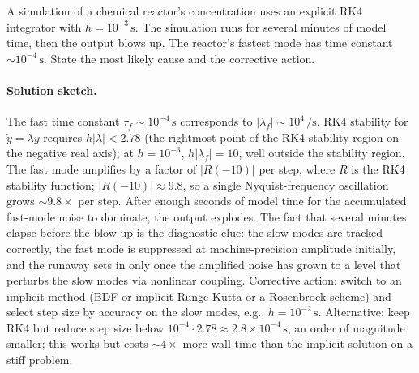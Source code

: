 \begin{exercise}
A simulation of a chemical reactor's concentration uses an
explicit RK4 integrator with $h = 10^{-3}\,\si{\second}$. The
simulation runs for several minutes of model time, then the
output blows up. The reactor's fastest mode has time constant
$\sim 10^{-4}\,\si{\second}$. State the most likely cause and
the corrective action.

\paragraph{Solution sketch.} The fast time constant $\tau_{f}
\sim 10^{-4}\,\si{\second}$ corresponds to $|\lambda_{f}| \sim
10^{4}\,\si{\per\second}$. RK4 stability for $\dot{y} = \lambda
y$ requires $h |\lambda| < 2.78$ (the rightmost point of the
RK4 stability region on the negative real axis); at $h =
10^{-3}$, $h |\lambda_{f}| = 10$, well outside the stability
region. The fast mode amplifies by a factor of $|R(-10)|$
per step, where $R$ is the RK4 stability function; $|R(-10)|
\approx 9.8$, so a single Nyquist-frequency oscillation grows
$\sim 9.8\times$ per step. After enough seconds of model time
for the accumulated fast-mode noise to dominate, the output
explodes. The fact that several minutes elapse before the
blow-up is the diagnostic clue: the slow modes are tracked
correctly, the fast mode is suppressed at machine-precision
amplitude initially, and the runaway sets in only once the
amplified noise has grown to a level that perturbs the slow
modes via nonlinear coupling. Corrective action: switch to an
implicit method (BDF or implicit Runge-Kutta or a Rosenbrock
scheme) and select step size by accuracy on the slow modes,
e.g., $h = 10^{-2}\,\si{\second}$. Alternative: keep RK4 but
reduce step size below $10^{-4} \cdot 2.78 \approx 2.8 \times
10^{-4}\,\si{\second}$, an order of magnitude smaller; this
works but costs $\sim 4\times$ more wall time than the implicit
solution on a stiff problem.
\end{exercise}

